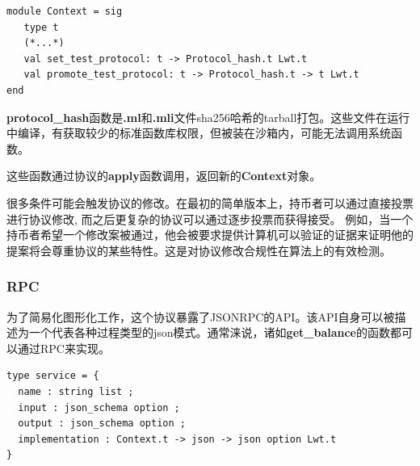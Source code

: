 \documentclass[letterpaper]{article}
\begin{document}
\begin{lstlisting}
module Context = sig
   type t
   (*...*)
   val set_test_protocol: t -> Protocol_hash.t Lwt.t
   val promote_test_protocol: t -> Protocol_hash.t -> t Lwt.t
end
\end{lstlisting}

\textbf{protocol\_hash}函数是\textbf{.ml}和\textbf{.mli}文件sha256哈希的tarball打包。这些文件在运行中编译，有获取较少的标准函数库权限，但被装在沙箱内，可能无法调用系统函数。

这些函数通过协议的\textbf{apply}函数调用，返回新的\textbf{Context}对象。

很多条件可能会触发协议的修改。在最初的简单版本上，持币者可以通过直接投票进行协议修改, 而之后更复杂的协议可以通过逐步投票而获得接受。
例如，当一个持币者希望一个修改案被通过，他会被要求提供计算机可以验证的证据来证明他的提案将会尊重协议的某些特性。这是对协议修改合规性在算法上的有效检测。

\subsubsection{RPC}
为了简易化图形化工作，这个协议暴露了JSONRPC的API。该API自身可以被描述为一个代表各种过程类型的json模式。通常涞说，诸如\textbf{get\_balance}的函数都可以通过RPC来实现。

\begin{lstlisting}
type service = {
  name : string list ;
  input : json_schema option ;
  output : json_schema option ;
  implementation : Context.t -> json -> json option Lwt.t
}
\end{lstlisting}
\end{document}
